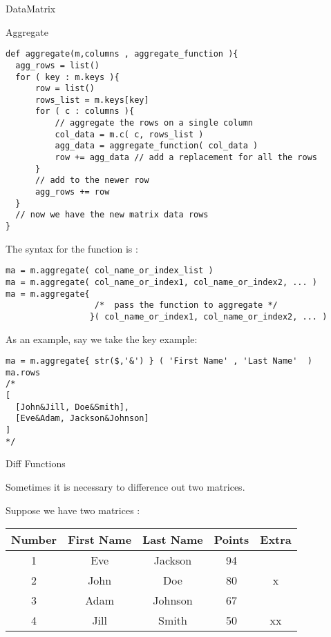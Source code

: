 \begin{section}{DataMatrix}
\begin{subsection}{Aggregate}
\begin{center}\begin{minipage}{\linewidth}
\begin{lstlisting}[style=JexlStyle]
def aggregate(m,columns , aggregate_function ){
  agg_rows = list()
  for ( key : m.keys ){
      row = list()
      rows_list = m.keys[key]  
      for ( c : columns ){
          // aggregate the rows on a single column
          col_data = m.c( c, rows_list ) 
          agg_data = aggregate_function( col_data )
          row += agg_data // add a replacement for all the rows   
      }
      // add to the newer row
      agg_rows += row 
  }
  // now we have the new matrix data rows
}
\end{lstlisting}
\end{minipage}\end{center}

The syntax for the function is :

\begin{lstlisting}[style=JexlStyle]
ma = m.aggregate( col_name_or_index_list )
ma = m.aggregate( col_name_or_index1, col_name_or_index2, ... )
ma = m.aggregate{ 
                  /*  pass the function to aggregate */  
                 }( col_name_or_index1, col_name_or_index2, ... )
\end{lstlisting}

As an example, say we take the key example:

\begin{lstlisting}[style=JexlStyle]
ma = m.aggregate{ str($,'&') } ( 'First Name' , 'Last Name'  )
ma.rows 
/* 
[ 
  [John&Jill, Doe&Smith], 
  [Eve&Adam, Jackson&Johnson]
] 
*/
\end{lstlisting}
\end{subsection}


\begin{subsection}{Diff Functions}

Sometimes it is necessary to difference out two matrices.

Suppose we have two matrices :

\begin{center}\label{matrix-diff}

\begin{tabular}{ |c|c|c|c|c| } 
 \hline
 Number	& First Name & Last Name & Points & Extra \\ 
 \hline 
   1    & Eve	     & Jackson	& 94      & \\
   2    & John       &  Doe	    & 80      &  x \\ 
   3    & Adam       & Johnson	& 67      &  \\	
   4    & Jill       & Smith	& 50      & xx \\  
 \hline  
\end{tabular}


\end{center}
\end{subsection}
\end{section}
